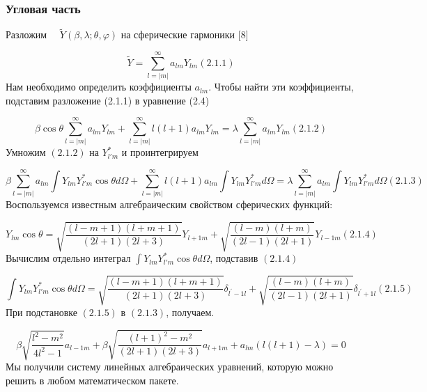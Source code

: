 \subsubsection{Угловая часть}
Разложим \ \  $\widetilde
Y(\beta ,\lambda ;\theta ,\varphi )$ на
сферические гармоники [8]

\begin{equation*}
\widetilde Y=\sum _{l=|m|}^{\infty}a_{\mathit{lm}}Y_{\mathit{lm}}(2.1.1)
\end{equation*}
Нам необходимо определить
коэффициенты  $a_{\mathit{lm}}$.
Чтобы найти эти коэффициенты, подставим разложение (2.1.1) в уравнение (2.4)

\begin{equation*}
\beta \cos \theta \sum _{l=|m|}^{\infty}a_{\mathit{lm}}Y_{\mathit{lm}}+\sum _{l=| m|
}^{\infty}l(l+1)a_{\mathit{lm}}Y_{\mathit{lm}}=\lambda \sum _{l=| m|
}^{\infty}a_{\mathit{lm}}Y_{\mathit{lm}}(2.1.2)
\end{equation*}
Умножим  $(2.1.2)$ на  $Y_{l'm}^{\ast }$ и
проинтегрируем

\begin{equation*}
\beta \sum _{l=| m| }^{\infty}a_{\mathit{lm}}\int Y_{\mathit{lm}}Y_{l'm}^{\ast }\cos \theta \mathit{d\Omega
}+\sum _{l=| m| }^{\infty}l(l+1)a_{\mathit{lm}}\int Y_{\mathit{lm}}Y_{l'm}^{\ast }\mathit{d\Omega }=\lambda
\sum _{l=| m| }^{\infty}a_{\mathit{lm}}\int Y_{\mathit{lm}}Y_{l'm}^{\ast }\mathit{d\Omega }(2.1.3)
\end{equation*}
Воспользуемся известным алгебраическим свойством сферических функций:

\begin{equation*}
Y_{\mathit{lm}}\cos \theta
=\sqrt{\frac{(l-m+1)(l+m+1)}{\left(2l+1\right)(2l+3)}}Y_{l+1m}+\sqrt{\frac{(l-m)(l+m)}{\left(2l-1\right)(2l+1)}}Y_{l-1m}(2.1.4)
\end{equation*}
Вычислим отдельно
интеграл  $\int Y_{\mathit{lm}}Y_{l'm}^{\ast }\cos \theta
\mathit{d\Omega }$, подставив  $(2.1.4)$

\begin{equation*}
\int Y_{\mathit{lm}}Y_{l'm}^{\ast }\cos \theta \mathit{d\Omega
}=\sqrt{\frac{(l-m+1)(l+m+1)}{\left(2l+1\right)(2l+3)}}\delta
_{l^{'}-1l}+\sqrt{\frac{(l-m)(l+m)}{\left(2l-1\right)(2l+1)}}\delta _{l^{'}+1l}(2.1.5)
\end{equation*}
При подстановке  $(2.1.5)$ в
$(2.1.3)$, получаем.

\begin{equation*}
\beta \sqrt{\frac{l^2-m^2}{4l^2-1}}a_{l-1m}+\beta
\sqrt{\frac{\left(l+1\right)^2-m^2}{\left(2l+1\right)(2l+3)}}a_{l+1m}+a_{\mathit{lm}}\left(l\left(l+1\right)-\lambda
\right)=0
\end{equation*}
Мы получили систему линейных алгебраических уравнений, которую можно решить в любом математическом пакете.

